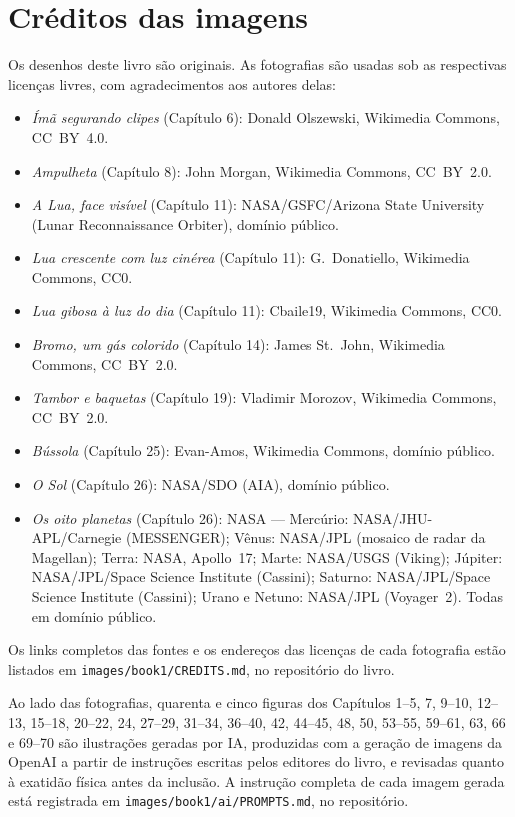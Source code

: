 \chapter*{Créditos das imagens}

Os desenhos deste livro são originais. As fotografias são usadas sob
as respectivas licenças livres, com agradecimentos aos autores delas:

\begin{itemize}
  \item \emph{Ímã segurando clipes} (Capítulo 6): Donald
        Olszewski, Wikimedia Commons, CC~BY~4.0.
  \item \emph{Ampulheta} (Capítulo 8): John Morgan, Wikimedia
        Commons, CC~BY~2.0.
  \item \emph{A Lua, face visível} (Capítulo 11): NASA/GSFC/Arizona
        State University (Lunar Reconnaissance Orbiter), domínio
        público.
  \item \emph{Lua crescente com luz cinérea} (Capítulo 11):
        G.~Donatiello, Wikimedia Commons, CC0.
  \item \emph{Lua gibosa à luz do dia} (Capítulo 11): Cbaile19,
        Wikimedia Commons, CC0.
  \item \emph{Bromo, um gás colorido} (Capítulo 14): James
        St.~John, Wikimedia Commons, CC~BY~2.0.
  \item \emph{Tambor e baquetas} (Capítulo 19): Vladimir Morozov,
        Wikimedia Commons, CC~BY~2.0.
  \item \emph{Bússola} (Capítulo 25): Evan-Amos, Wikimedia Commons,
        domínio público.
  \item \emph{O Sol} (Capítulo 26): NASA/SDO (AIA), domínio
        público.
  \item \emph{Os oito planetas} (Capítulo 26): NASA ---
        Mercúrio: NASA/JHU-APL/Carnegie (MESSENGER); Vênus:
        NASA/JPL (mosaico de radar da Magellan); Terra: NASA,
        Apollo~17; Marte: NASA/USGS (Viking); Júpiter:
        NASA/JPL/Space Science Institute (Cassini); Saturno:
        NASA/JPL/Space Science Institute (Cassini); Urano e Netuno:
        NASA/JPL (Voyager~2). Todas em domínio público.
\end{itemize}

Os links completos das fontes e os endereços das licenças de cada
fotografia estão listados em \texttt{images/book1/CREDITS.md}, no
repositório do livro.

\bigskip
Ao lado das fotografias, quarenta e cinco figuras dos Capítulos 1--5,
7, 9--10, 12--13, 15--18, 20--22, 24, 27--29, 31--34, 36--40, 42,
44--45, 48, 50, 53--55, 59--61, 63, 66 e 69--70 são ilustrações
geradas por IA, produzidas com a geração de imagens da OpenAI a
partir de instruções escritas pelos editores do livro, e revisadas
quanto à exatidão física antes da inclusão. A instrução completa de
cada imagem gerada está registrada em
\texttt{images/book1/ai/PROMPTS.md}, no repositório.
\clearpage
